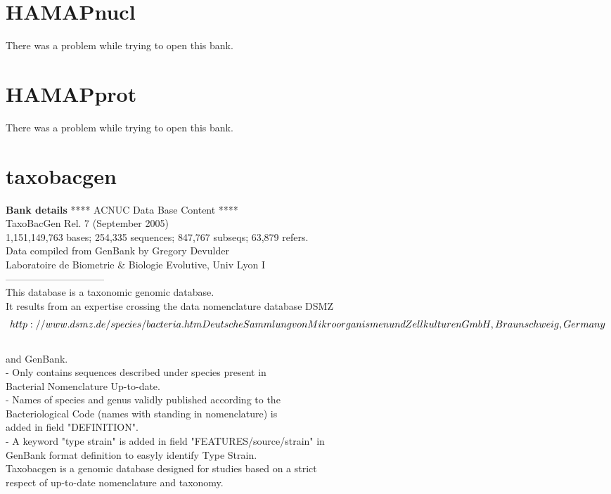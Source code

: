 \documentclass{article}
\begin{document}
\begin{Schunk}
\section{ HAMAPnucl }
There was a problem while trying to open this bank.
\section{ HAMAPprot }
There was a problem while trying to open this bank.
\section{ taxobacgen }
\textbf{Bank details}
               ****     ACNUC Data Base Content      ****\\
                 TaxoBacGen Rel. 7 (September 2005)\\
1,151,149,763 bases; 254,335 sequences; 847,767 subseqs; 63,879 refers.\\
	Data compiled from GenBank by Gregory Devulder \\
        Laboratoire de Biometrie \& Biologie Evolutive, Univ Lyon I\\
------------------------------\\
This database is a taxonomic genomic database. \\
It results from an expertise crossing the data nomenclature database DSMZ\\
\[http://www.dsmz.de/species/bacteria.htm Deutsche Sammlung von\\
Mikroorganismen und Zellkulturen GmbH, Braunschweig, Germany\]\\
and GenBank. \\
- Only contains sequences described under species present in \\
Bacterial Nomenclature Up-to-date.\\
- Names of species and genus validly published according to the\\
Bacteriological Code (names with standing in nomenclature) is \\
added in field "DEFINITION".\\
- A keyword "type strain" is added in field "FEATURES/source/strain" in\\
GenBank format definition to easyly identify Type Strain.\\
Taxobacgen is a genomic database designed for studies based on a strict\\
respect of up-to-date nomenclature and taxonomy.


\end{Schunk}
\end{document}
